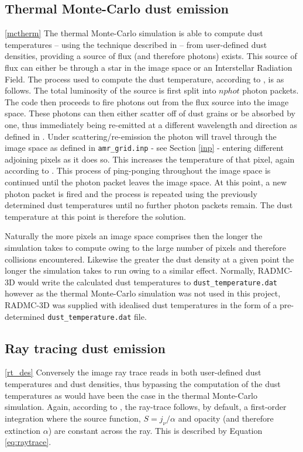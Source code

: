 \documentclass{report}
\begin{document}
\subsection{Thermal Monte-Carlo dust emission} \ref{mctherm}
The thermal Monte-Carlo simulation is able to compute dust temperatures – using the technique described in \textcite{b&w} – from user-defined dust densities, providing a source of flux (and therefore photons) exists. This source of flux can either be through a star in the image space or an Interstellar Radiation Field. The process used to compute the dust temperature, according to \textcite{manual}, is as follows. The total luminosity of the source is first split into $nphot$ photon packets. The code then proceeds to \textquotesingle fire \textquotesingle photons out from the flux source into the image space. These photons can then either scatter off of dust grains or be absorbed by one, thus immediately being re-emitted at a different wavelength and direction as defined in \textcite{b&w}. Under scattering/re-emission the photon will travel through the image space as defined in \texttt{amr\_grid.inp} - see Section \ref{inp} - entering different adjoining pixels as it does so. This increases the temperature of that pixel, again according to \textcite{b&w}. This process of \textquotesingle ping-ponging \textquotesingle throughout the image space is continued until the photon packet leaves the image space. At this point, a new photon packet is \textquotesingle fired \textquotesingle and the process is repeated using the previously determined dust temperatures until no further photon packets remain. The dust temperature at this point is therefore the solution.

Naturally the more pixels an image space comprises then the longer the simulation takes to compute owing to the large number of pixels and therefore collisions encountered. Likewise the greater the dust density at a given point the longer the simulation takes to run owing to a similar effect. Normally, RADMC-3D would write the calculated dust temperatures to \texttt{dust\_temperature.dat} however as the thermal Monte-Carlo simulation was not used in this project, RADMC-3D was supplied with idealised dust temperatures in the form of a pre-determined \texttt{dust\_temperature.dat} file.

\subsection{Ray tracing dust emission} \ref{rt_des}
Conversely the image ray trace reads in both user-defined dust temperatures and dust densities, thus bypassing the computation of the dust temperatures as would have been the case in the thermal Monte-Carlo simulation. Again, according to \textcite{manual}, the ray-trace follows, by default, a first-order integration where the source function, $S = j_{\nu}/\alpha$ and opacity (and therefore extinction $\alpha$) are constant across the ray. This is described by Equation \ref{eq:raytrace}.
\end{document}
